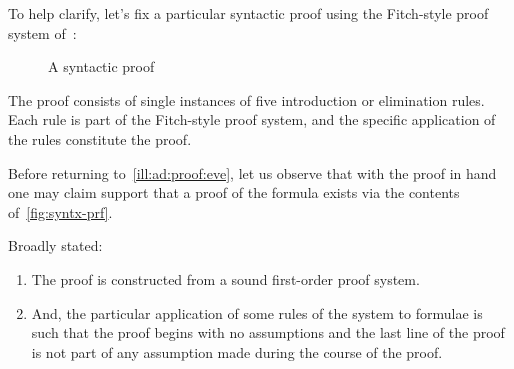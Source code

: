 \begin{note}
  To help clarify, let's fix a particular syntactic proof using the Fitch-style proof system of~\textcite[557--560]{Barwise:1999tu}:

  \begin{figure}[H]
    \centering
    \begin{quote}
    \end{quote}
    \caption{A syntactic proof}\label{fig:syntx-prf}
  \end{figure}

  The proof consists of single instances of five introduction or elimination rules.
  Each rule is part of the Fitch-style proof system, and the specific application of the rules constitute the proof.
\end{note}


\begin{note}
  Before returning to~\autoref{ill:ad:proof:eve}, let us observe that with the proof in hand one may claim support that a proof of the formula exists via the contents of~\autoref{fig:syntx-prf}.

  Broadly stated:

  \begin{enumerate}
  \item The proof is constructed from a sound first-order proof system.
  \item And, the particular application of some rules of the system to formulae is such that the proof begins with no assumptions and the last line of the proof is not part of any assumption made during the course of the proof.
  \end{enumerate}
\end{note}

